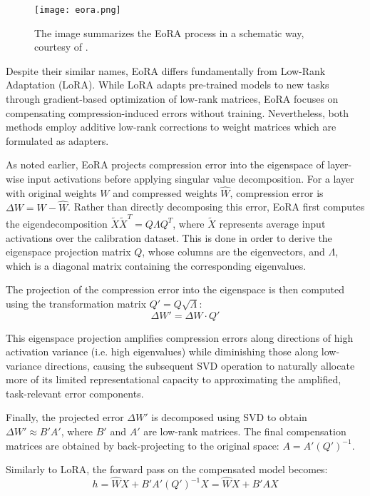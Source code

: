 \begin{figure}[htbp]
    \centering
    \texttt{[image: eora.png]}
    \caption[EoRA Overview]{The image summarizes the EoRA process in a schematic way, courtesy of \cite{eora}.}
    \label{fig:eora}
\end{figure}


Despite their similar names, EoRA differs fundamentally from Low-Rank Adaptation (LoRA). While LoRA adapts pre-trained models to new tasks through gradient-based optimization of low-rank matrices, EoRA focuses on compensating compression-induced errors without training. Nevertheless, both methods employ additive low-rank corrections to weight matrices which are formulated as adapters.

As noted earlier, EoRA projects compression error into the eigenspace of layer-wise input activations before applying singular value decomposition. For a layer with original weights $W$ and compressed weights $\hat{W}$, compression error is $\Delta W = W - \hat{W}$. Rather than directly decomposing this error, EoRA first computes the eigendecomposition $\tilde{X}\tilde{X}^T = Q\Lambda Q^T$, where $\tilde{X}$ represents average input activations over the calibration dataset. This is done in order to derive the eigenspace projection matrix $Q$, whose columns are the eigenvectors, and $\Lambda$, which is a diagonal matrix containing the corresponding eigenvalues.

The projection of the compression error into the eigenspace is then computed using the transformation matrix $Q' = Q\sqrt{\Lambda}$:
\begin{equation}
\Delta W' = \Delta W \cdot Q'
\end{equation}

This eigenspace projection amplifies compression errors along directions of high activation variance (i.e. high eigenvalues) while diminishing those along low-variance directions, causing the subsequent SVD operation to naturally allocate more of its limited representational capacity to approximating the amplified, task-relevant error components.

Finally, the projected error $\Delta W'$ is decomposed using SVD to obtain $\Delta W' \approx B'A'$, where $B'$ and $A'$ are low-rank matrices. The final compensation matrices are obtained by back-projecting to the original space: $A = A'(Q')^{-1}$.

Similarly to LoRA, the forward pass on the compensated model becomes:
\begin{equation}
h = \hat{W}X + B'A'(Q')^{-1}X = \hat{W}X + B'AX
\end{equation}

